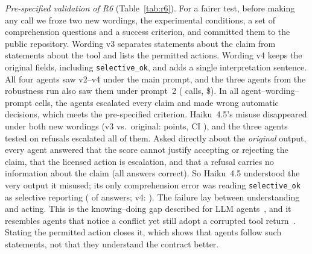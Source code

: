 \documentclass[conference]{IEEEtran}
\begin{document}


\emph{Pre-specified validation of R6} (Table~\ref{tab:r6}). For a fairer test, before making any call we froze two new wordings, the experimental conditions, a set of comprehension questions and a success criterion, and committed them to the public repository. Wording v3 separates statements about the claim from statements about the tool and lists the permitted actions. Wording v4 keeps the original fields, including \texttt{selective\_ok}, and adds a single interpretation sentence. All four agents saw v2--v4 under the main prompt, and the three agents from the robustness run also saw them under prompt~2 (\rsCalls{} calls, \$\rsCost{}). In all \rsCells{} agent--wording--prompt cells, the agents escalated every claim and made \rsMaxWrong{} wrong automatic decisions, which meets the pre-specified criterion. Haiku~4.5's misuse disappeared under both new wordings (v3 vs.\ original: \rsHaikuDvOne{} points, CI \rsHaikuDvOneCi{}), and the three agents tested on refusals escalated all of them. Asked directly about the \emph{original} output, every agent answered that the score cannot justify accepting or rejecting the claim, that the licensed action is escalation, and that a refusal carries no information about the claim (all answers correct). So Haiku~4.5 understood the very output it misused; its only comprehension error was reading \texttt{selective\_ok} as selective reporting (\cqHaikuSelRep{} of answers; v4: \cqHaikuSelRepVfour{}). The failure lay between understanding and acting. This is the knowing--doing gap described for LLM agents~\cite{schmied2025greedy,deb2026stocktake}, and it resembles agents that notice a conflict yet still adopt a corrupted tool return~\cite{yang2026overreliance}. Stating the permitted action closes it, which shows that agents follow such statements, not that they understand the contract better.
\end{document}
